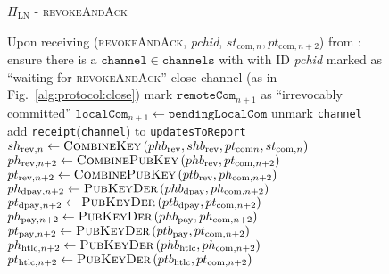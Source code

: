   \begin{figure}[H]
    \begin{protocolbox}{$\Pi_{\mathrm{LN}}$ - \textsc{revokeAndAck}}
      \begin{algorithmic}[1]
        \State Upon receiving (\textsc{revokeAndAck}, \textit{pchid},
        $st_{\mathrm{com}, n}, pt_{\mathrm{com}, n+2}$) from \bob:
        \Indent
          \State ensure there is a $\mathtt{channel} \in \mathtt{channels}$ with
          \bob{} with ID \textit{pchid} marked as ``waiting for
          \textsc{revokeAndAck}''
          \label{alg:protocol:pay:revokeAndAck:ensure}
           
            \State close channel (as in Fig.~\ref{alg:protocol:close})
            \State \Return
          \EndIf
          \State mark $\mathtt{remoteCom}_{n+1}$ as ``irrevocably committed''
          \State $\mathtt{localCom}_{n+1} \gets \mathtt{pendingLocalCom}$
          \State unmark \texttt{channel}
          \State add \texttt{receipt}(\texttt{channel}) to
          \texttt{updatesToReport}
          \label{alg:protocol:pay:raa:report}
          \State $sh_{\mathrm{rev}, n} \gets
          \textsc{CombineKey}\left(phb_{\mathrm{rev}}, shb_{\mathrm{rev}},
          pt_{\mathrm{com} n}, st_{\mathrm{com}, n}\right)$
          \State $ph_{\mathrm{rev}, n+2} \gets
          \textsc{CombinePubKey}\left(phb_{\mathrm{rev}}, pt_{\mathrm{com},
          n+2}\right)$
          \State $pt_{\mathrm{rev}, n+2} \gets
          \textsc{CombinePubKey}\left(ptb_{\mathrm{rev}}, ph_{\mathrm{com},
          n+2}\right)$
          \State $ph_{\mathrm{dpay}, n+2} \gets
          \textsc{PubKeyDer}\left(phb_{\mathrm{dpay}}, ph_{\mathrm{com},
          n+2}\right)$
          \State $pt_{\mathrm{dpay}, n+2} \gets
          \textsc{PubKeyDer}\left(ptb_{\mathrm{dpay}}, pt_{\mathrm{com},
          n+2}\right)$
          \State $ph_{\mathrm{pay}, n+2} \gets
          \textsc{PubKeyDer}\left(phb_{\mathrm{pay}}, ph_{\mathrm{com},
          n+2}\right)$
          \State $pt_{\mathrm{pay}, n+2} \gets
          \textsc{PubKeyDer}\left(ptb_{\mathrm{pay}}, pt_{\mathrm{com},
          n+2}\right)$
          \State $ph_{\mathrm{htlc}, n+2} \gets
          \textsc{PubKeyDer}\left(phb_{\mathrm{htlc}}, ph_{\mathrm{com},
          n+2}\right)$
          \State $pt_{\mathrm{htlc}, n+2} \gets
          \textsc{PubKeyDer}\left(ptb_{\mathrm{htlc}}, pt_{\mathrm{com},
          n+2}\right)$
        \EndIndent
      \end{algorithmic}
    \end{protocolbox}
    \caption{}
    \label{alg:protocol:pay:revokeAndAck}
  \end{figure}

